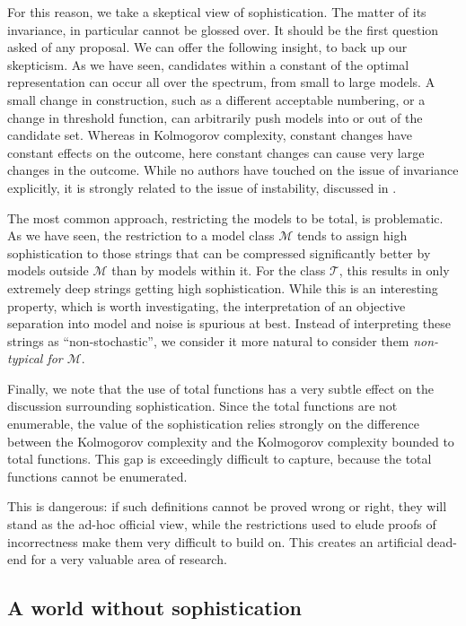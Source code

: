 \documentclass{style/llncs}
\newcommand{\M}{\mathscr M}
\newcommand{\T}{\mathscr T}
\begin{document}
For this reason, we take a skeptical view of sophistication. The matter of its invariance, in particular cannot be glossed over. It should be the first question asked of any proposal. We can offer the following insight, to back up our skepticism. As we have seen, candidates within a constant of the optimal representation can occur all over the spectrum, from small to large models. A small change in construction, such as a different acceptable numbering, or a change in threshold function, can arbitrarily push models into or out of the candidate set. Whereas in Kolmogorov complexity, constant changes have constant effects on the outcome, here constant changes can cause very large changes in the outcome. While no authors have touched on the issue of invariance explicitly, it is strongly related to the issue of instability, discussed in \cite{antunes2013sophistication,vereshchagin2013algorithmic}.

The most common approach, restricting the models to be total, is problematic. As we have seen, the restriction to a model class $\M$ tends to assign high sophistication to those strings that can be compressed significantly better by models outside $\M$ than by models within it. For the class $\T$, this results in only extremely deep strings getting high sophistication. While this is an interesting property, which is worth investigating, the interpretation of an objective separation into model and noise is spurious at best. Instead of interpreting these strings as ``non-stochastic'', we consider it more natural to consider them \emph{non-typical for $\M$}.  

Finally, we note that the use of total functions has a very subtle effect on the discussion surrounding sophistication. Since the total functions are not enumerable, the value of the sophistication relies strongly on the difference between the Kolmogorov complexity and the Kolmogorov complexity bounded to total functions. This gap is exceedingly difficult to capture, because the total functions cannot be enumerated. 

This is dangerous: if such definitions cannot be proved wrong or right, they will stand as the ad-hoc official view, while the restrictions used to elude proofs of incorrectness make them very difficult to build on. This creates an artificial dead-end for a very valuable area of research.

\subsection{A world without sophistication}
\end{document}
